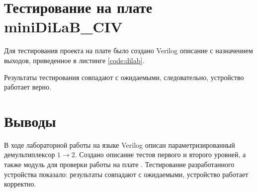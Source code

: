 \section{Тестирование на плате miniDiLaB\_CIV}

Для тестирования проекта на плате было создано Verilog описание с назначением выходов, приведенное в листинге  \ref{code:dilab}.


Результаты тестирования совпадают с ожидаемыми, следовательно, устройство работает верно.

\section{Выводы}

В ходе лабораторной работы на языке Verilog описан параметризированный демультиплексор $1 \rightarrow 2$. Создано описание тестов первого и второго уровней, а также модуль для проверки работы на плате . Тестирование разработанного устройства показало: результаты совпадают с ожидаемыми, устройство работает корректно.

